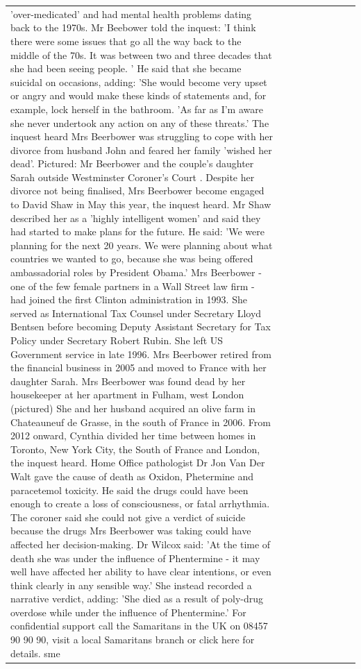 \begin{table}[H]
\begin{tabular}{lllrlllll}
'over-medicated' and had mental health problems dating back to the 1970s. Mr Beebower told the inquest: 'I think there were some issues that go all the way back to the middle of the 70s. It was between two and three decades that she had been seeing people. ' He said that she became suicidal on occasions, adding: 'She would become very upset or angry and would make these kinds of statements and, for example, lock herself in the bathroom. 'As far as I'm aware she never undertook any action on any of these threats.' The inquest heard Mrs Beerbower was struggling to cope with her divorce from husband John and feared her family 'wished her dead'. Pictured: Mr Beerbower and the couple's daughter Sarah outside Westminster Coroner's Court . Despite her divorce not being finalised, Mrs Beerbower become engaged to David Shaw in May this year, the inquest heard. Mr Shaw described her as a 'highly intelligent women' and said they had started to make plans for the future. He said: 'We were planning for the next 20 years. We were planning about what countries we wanted to go, because she was being offered ambassadorial roles by President Obama.' Mrs Beerbower - one of the few female partners in a Wall Street law firm - had joined the first Clinton administration in 1993. She served as International Tax Counsel under Secretary Lloyd Bentsen before becoming Deputy Assistant Secretary for Tax Policy under Secretary Robert Rubin. She left US Government service in late 1996. Mrs Beerbower retired from the financial business in 2005 and moved to France with her daughter Sarah. Mrs Beerbower was found dead by her housekeeper at her apartment in Fulham, west London (pictured) She and her husband acquired an olive farm in Chateauneuf de Grasse, in the south of France in 2006. From 2012 onward, Cynthia divided her time between homes in Toronto, New York City, the South of France and London, the inquest heard. Home Office pathologist Dr Jon Van Der Walt gave the cause of death as Oxidon, Phetermine and paracetemol toxicity. He said the drugs could have been enough to create a loss of consciousness, or fatal arrhythmia. The coroner said she could not give a verdict of suicide because the drugs Mrs Beerbower was taking could have affected her decision-making. Dr Wilcox said: 'At the time of death she was under the influence of Phentermine - it may well have affected her ability to have clear intentions, or even think clearly in any sensible way.' She instead recorded a narrative verdict, adding: 'She died as a result of poly-drug overdose while under the influence of Phentermine.' For confidential support call the Samaritans in the UK on 08457 90 90 90, visit a local Samaritans branch or click here for details. sme \\

\end{tabular}
\end{table}
